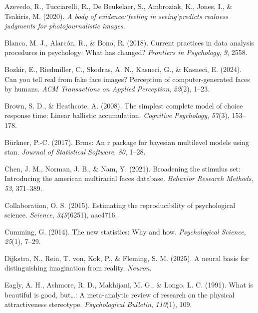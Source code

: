 \documentclass[
  jou,
  floatsintext,
  longtable,
  nolmodern,
  notxfonts,
  notimes,
  colorlinks=true,linkcolor=blue,citecolor=blue,urlcolor=blue]{apa7}
\newlength{\cslhangindent}
\newenvironment{CSLReferences}[2] %
 {\begin{list}{}{%
  \setlength{\itemindent}{0pt}
  \setlength{\leftmargin}{0pt}
  \setlength{\parsep}{0pt}
  \ifodd #1
   \setlength{\leftmargin}{\cslhangindent}
   \setlength{\itemindent}{-1\cslhangindent}
  \fi
  \setlength{\itemsep}{#2\baselineskip}}}
 {\end{list}}
\begin{document}
\label{refs}
\begin{CSLReferences}{1}{0}
Azevedo, R., Tucciarelli, R., De Beukelaer, S., Ambroziak, K., Jones,
I., \& Tsakiris, M. (2020). \emph{A body of evidence:`feeling in
seeing'predicts realness judgments for photojournalistic images.}

Blanca, M. J., Alarcón, R., \& Bono, R. (2018). Current practices in
data analysis procedures in psychology: What has changed?
\emph{Frontiers in Psychology}, \emph{9}, 2558.

Bozkir, E., Riedmiller, C., Skodras, A. N., Kasneci, G., \& Kasneci, E.
(2024). Can you tell real from fake face images? Perception of
computer-generated faces by humans. \emph{ACM Transactions on Applied
Perception}, \emph{22}(2), 1--23.

Brown, S. D., \& Heathcote, A. (2008). The simplest complete model of
choice response time: Linear ballistic accumulation. \emph{Cognitive
Psychology}, \emph{57}(3), 153--178.

Bürkner, P.-C. (2017). Brms: An r package for bayesian multilevel models
using stan. \emph{Journal of Statistical Software}, \emph{80}, 1--28.

Chen, J. M., Norman, J. B., \& Nam, Y. (2021). Broadening the stimulus
set: Introducing the american multiracial faces database. \emph{Behavior
Research Methods}, \emph{53}, 371--389.

Collaboration, O. S. (2015). Estimating the reproducibility of
psychological science. \emph{Science}, \emph{349}(6251), aac4716.

Cumming, G. (2014). The new statistics: Why and how. \emph{Psychological
Science}, \emph{25}(1), 7--29.

Dijkstra, N., Rein, T. von, Kok, P., \& Fleming, S. M. (2025). A neural
basis for distinguishing imagination from reality. \emph{Neuron}.

Eagly, A. H., Ashmore, R. D., Makhijani, M. G., \& Longo, L. C. (1991).
What is beautiful is good, but\ldots: A meta-analytic review of research
on the physical attractiveness stereotype. \emph{Psychological
Bulletin}, \emph{110}(1), 109.


\end{CSLReferences}
\end{document}
